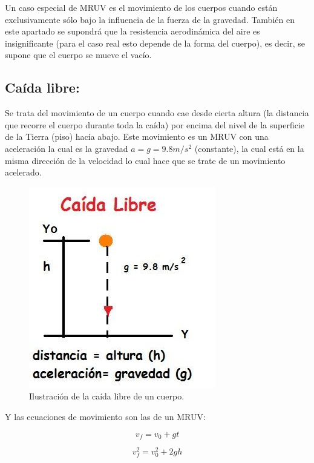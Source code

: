 \documentclass[a5paper,pagesize,10pt,bibtotoc,pointlessnumbers,
normalheadings,DIV=9,fleqn,x11names,table,twoside=false]{scrbook}
\begin{document}
Un caso especial de MRUV es el movimiento de los cuerpos cuando están exclusivamente sólo bajo la influencia de la fuerza de la 
gravedad. También en este apartado se supondrá que la resistencia aerodinámica del aire es insignificante (para el caso real esto 
depende de la forma del cuerpo), es decir, se supone que el cuerpo se mueve el vacío. 

\subsection{Caída libre:}

Se trata del movimiento de un cuerpo cuando cae desde cierta altura (la distancia que recorre el cuerpo durante toda la caída) 
por encima del nivel de la superficie de la Tierra (piso) hacia abajo. Este movimiento es un MRUV con una aceleración la cual es 
la gravedad $a = g = 9.8 m/s^2$ (constante), la cual está en la misma dirección de la velocidad lo cual hace que se trate de un 
movimiento acelerado. 

\begin{figure}[ht]
 \centering
 \includegraphics[scale=0.5]{images/caida-libre.jpg}
 \caption{Ilustración de la caída libre de un cuerpo.}\label{caidalibre}
\end{figure} 

Y las ecuaciones de movimiento son las de un MRUV:

\begin{equation}
 v_f = v_0 + gt
\end{equation}

\begin{equation}
 v_f^2 = v_0^2 + 2gh
\end{equation}
\end{document}

